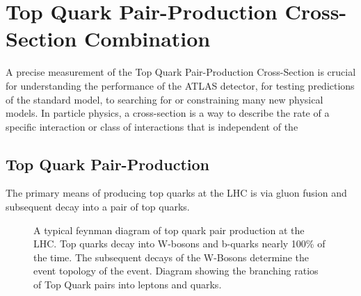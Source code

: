 %
%
%

\section{Top Quark Pair-Production Cross-Section Combination}

A precise measurement of the Top Quark Pair-Production Cross-Section is crucial for understanding the performance of the ATLAS detector, for testing predictions of the standard model, to searching for or constraining many new physical models.
In particle physics, a cross-section is a way to describe the rate of a specific interaction or class of interactions that is independent of the 


\subsection{Top Quark Pair-Production}

The primary means of producing top quarks at the LHC is via gluon fusion and subsequent decay into a pair of top quarks.

\begin{figure}
  \begin{center}

  \end{center}
  \caption{ A typical feynman diagram of top quark pair production at the LHC.  Top quarks decay into W-bosons and b-quarks nearly 100\% of the time.  The subsequent decays of the W-Bosons determine the event topology of the \ttbar event.  Diagram showing the branching ratios of Top Quark pairs into leptons and quarks.}
  \label{img:TopQuarkPairProduction}
\end{figure}

